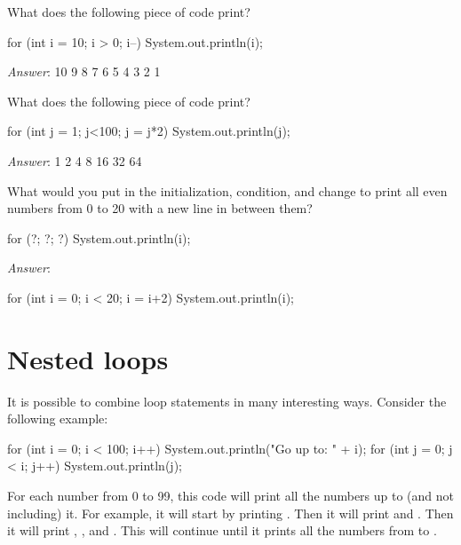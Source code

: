\begin{example}
What does the following piece of code print?

\begin{code}
for (int i = 10; i > 0; i--)
{
    System.out.println(i);
}
\end{code}

\emph{Answer}: 
10
9
8
7
6
5
4
3
2
1
\end{example}

\begin{example}
What does the following piece of code print?

\begin{code}
for (int j = 1; j<100; j = j*2)
{
    System.out.println(j);
}
\end{code}

\emph{Answer}: 
1
2
4
8
16
32
64
\end{example}

\begin{example}
What would you put in the initialization, condition, and change to print all even numbers from 0 to 20 with a new line in between them?

\begin{code}
for (?; ?; ?)
{
    System.out.println(i);
}
\end{code}

\emph{Answer}:
\begin{code}
for (int i = 0; i < 20; i = i+2)
{
    System.out.println(i);
}
\end{code}
\end{example}

\section{Nested loops}
It is possible to combine loop statements in many interesting ways. Consider the following example:

\begin{code}
for (int i = 0; i < 100; i++)
{
    System.out.println("Go up to: " + i);
    for (int j = 0; j < i; j++)
    {
        System.out.println(j);
    }
}
\end{code}

\noindent For each number from 0 to 99, this code will print all the numbers up to (and not including) it.  For example, it will start by printing . Then it will print 
and .  Then it will print , , and .  This will continue until it prints all the numbers from  to .

